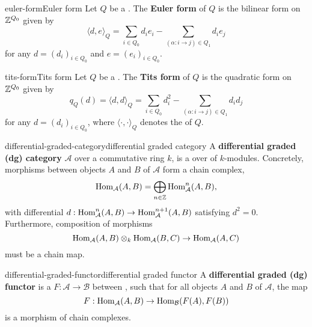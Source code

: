 \begin{topic}{euler-form}{Euler form}
    Let $Q$ be a . The \textbf{Euler form} of $Q$ is the bilinear form on $\mathbb{Z}^{Q_0}$ given by
    \[ \langle d, e \rangle_Q = \sum_{i \in Q_0} d_i e_i - \sum_{(\alpha : i \to j) \in Q_1} d_i e_j \]
    for any $d = (d_i)_{i \in Q_0}$ and $e = (e_i)_{i \in Q_0}$.
\end{topic}

\begin{topic}{tits-form}{Tits form}
    Let $Q$ be a . The \textbf{Tits form} of $Q$ is the quadratic form on $\mathbb{Z}^{Q_0}$ given by
    \[ q_Q(d) = \langle d, d \rangle_Q = \sum_{i \in Q_0} d_i^2 - \sum_{(\alpha : i \to j) \in Q_1} d_i d_j \]
    for any $d = (d_i)_{i \in Q_0}$, where $\langle \cdot, \cdot \rangle_Q$ denotes the  of $Q$.
\end{topic}

\begin{topic}{differential-graded-category}{differential graded category}
    A \textbf{differential graded (dg) category} $\mathcal{A}$ over a commutative ring $k$, is a   over  of $k$-modules. Concretely, morphisms between objects $A$ and $B$ of $\mathcal{A}$ form a chain complex,
    \[ \text{Hom}_\mathcal{A}(A, B) = \bigoplus_{n \in \mathbb{Z}} \text{Hom}^n_\mathcal{A}(A, B) , \]
    with differential $d : \text{Hom}^n_\mathcal{A}(A, B) \to \text{Hom}^{n + 1}_\mathcal{A}(A, B)$ satisfying $d^2 = 0$. Furthermore, composition of morphisms
    \[ \text{Hom}_\mathcal{A}(A, B) \otimes_k \text{Hom}_\mathcal{A}(B, C) \to \text{Hom}_\mathcal{A}(A, C) \]
    must be a chain map.
\end{topic}

\begin{topic}{differential-graded-functor}{differential graded functor}
    A \textbf{differential graded (dg) functor} is a  $F : \mathcal{A} \to \mathcal{B}$ between , such that for all objects $A$ and $B$ of $\mathcal{A}$, the map
    \[ F : \text{Hom}_\mathcal{A}(A, B) \to \text{Hom}_\mathcal{B}(F(A), F(B)) \]
    is a morphism of chain complexes.
\end{topic}
